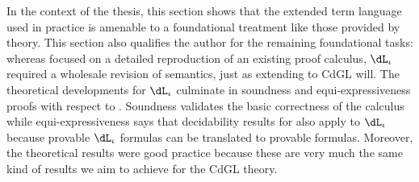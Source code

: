 \documentclass[12pt]{cmuthesis}
\theoremstyle{definition}
\theoremstyle{remark}
\newcommand{\rref}[2][]{\prettyref{#2}}
\newcommand{\CdGL}{\textsf{CdGL}\xspace}
\newcommand{\dLi}{\ensuremath{\dL_\iota}\xspace}
\begin{document}
In the context of the thesis, this section shows that the extended term language used in practice is amenable to a foundational treatment like those provided by theory.
This section also qualifies the author for the remaining foundational tasks: whereas \rref{sec:isabelle-fml} focused on a detailed reproduction of an existing proof calculus, 
\dLi required a wholesale revision of \dL semantics, just as extending \dGL to \CdGL will.
The theoretical developments for \dLi culminate in soundness and equi-expressiveness proofs with respect to \dL.
Soundness validates the basic correctness of the calculus while equi-expressiveness says that decidability results for \dL also apply to \dLi because provable \dLi formulas can be translated to provable \dL formulas.
Moreover, the theoretical results were good practice because these are very much the same kind of results we aim to achieve for the \CdGL theory.
\end{document}
